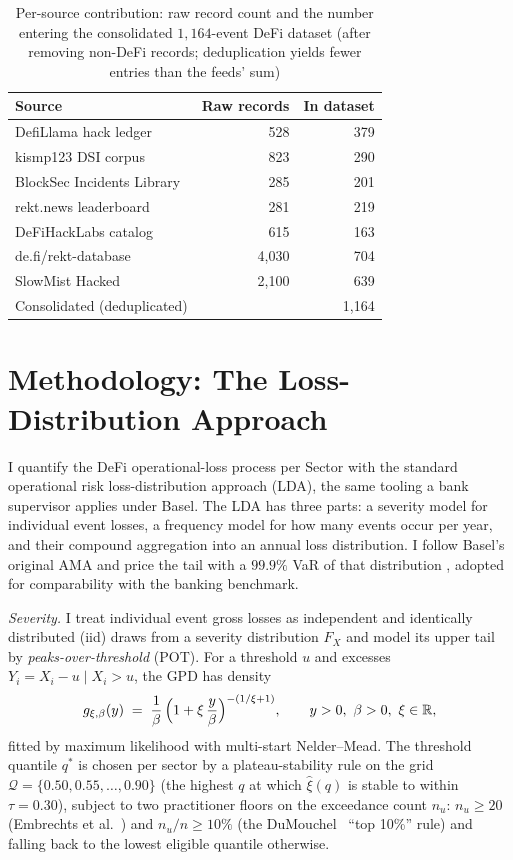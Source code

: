 \documentclass[runningheads]{llncs}
\begin{document}
\begin{table}[tb]
\centering
\caption{Per-source contribution: raw record count and the number
entering the consolidated $1{,}164$-event DeFi dataset (after removing
non-DeFi records; deduplication yields fewer entries than the feeds' sum)}
\label{tab:source-counts}
\small
\begin{tabular}{l r r}
\toprule
Source & Raw records & In dataset \\
\midrule
DefiLlama hack ledger      &   528 & 379 \\
kismp123 DSI corpus        &   823 & 290 \\
BlockSec Incidents Library &   285 & 201 \\
rekt.news leaderboard      &   281 & 219 \\
DeFiHackLabs catalog       &   615 & 163 \\
de.fi/rekt-database        & 4{,}030 &   704 \\
SlowMist Hacked            & 2{,}100 &   639 \\
\midrule
Consolidated (deduplicated) & & 1{,}164 \\
\bottomrule
\end{tabular}
\end{table}

\section{Methodology: The Loss-Distribution Approach}\label{sec:method}

I quantify the DeFi operational-loss process per Sector with the standard
operational risk loss-distribution approach (LDA), the same tooling
a bank supervisor applies under Basel. The LDA has three parts: a
severity model for individual event losses, a frequency model for how
many events occur per year, and their compound aggregation into an
annual loss distribution. I follow Basel's original AMA and price the
tail with a $99.9\%$ VaR of that distribution \citep{BCBS2017},
adopted for comparability with the banking benchmark.

\emph{Severity.} I treat individual event gross losses as independent and identically distributed (iid) draws
from a severity distribution $F_X$ and model its upper tail by
\emph{peaks-over-threshold} (POT). For a threshold $u$ and excesses
$Y_i = X_i - u \mid X_i > u$, the GPD has density
\begin{equation}
g_{\xi,\beta}(y)
  \;=\; \frac{1}{\beta}\,\Bigl(1 + \xi\,\frac{y}{\beta}\Bigr)^{-(1/\xi + 1)},
  \qquad y>0,\ \beta>0,\ \xi\in\mathbb{R},
\end{equation}
fitted by maximum likelihood with multi-start Nelder--Mead. The
threshold quantile $q^*$ is chosen per sector by a plateau-stability
rule on the grid $\mathcal Q = \{0.50, 0.55, \dots, 0.90\}$ (the
highest $q$ at which $\hat\xi(q)$ is stable to within $\tau = 0.30$),
subject to two practitioner floors on the exceedance count $n_u$:
$n_u \ge 20$ (Embrechts et al.~\cite{EmbrechtsKM1997}) and
$n_u/n \ge 10\%$ (the DuMouchel~\cite{DuMouchel1983} ``top 10\%''
rule) and falling back to the lowest eligible quantile otherwise.
\end{document}
